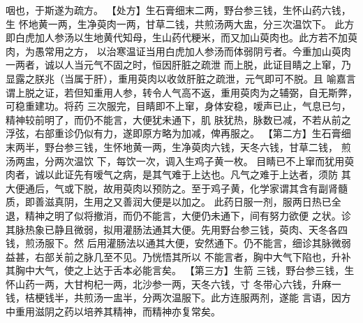 \documentclass[a4paper,12pt,UTF8,twoside]{ctexbook}
\begin{document}
咽也，于斯遂为疏方。 
【处方】生石膏细末二两，野台参三钱，生怀山药六钱，生 
怀地黄一两，生净萸肉一两，甘草二钱，共煎汤两大盅，分三次温饮下。 
此方即白虎加人参汤以生地黄代知母，生山药代粳米，而又加山萸肉也。此方若不加萸肉，为愚常用之方， 
以治寒温证当用白虎加人参汤而体弱阴亏者。今重加山萸肉一两者，诚以人当元气不固之时，恒因肝脏之疏泄 
而上脱，此证目睛之上窜，乃显露之朕兆（当属于肝），重用萸肉以收敛肝脏之疏泄，元气即可不脱。且 
喻嘉言谓上脱之证，若但知重用人参，转令人气高不返，重用萸肉为之辅弼，自无斯弊，可稳重建功。将药 
三次服完，目睛即不上窜，身体安稳，嗳声已止，气息已匀，精神较前明了，而仍不能言，大便犹未通下，肌 
肤犹热，脉数已减，不若从前之浮弦，右部重诊仍似有力，遂即原方略为加减，俾再服之。 
【第二方】生石膏细末两半，野台参三钱，生怀地黄一两，生净萸肉六钱，天冬六钱，甘草二钱， 
煎汤两盅，分两次温饮 
下，每饮一次，调入生鸡子黄一枚。 
目睛已不上窜而犹用萸肉者，诚以此证先有嗳气之病，是其气难于上达也。凡气之难于上达者，须防 
其大便通后，气或下脱，故用萸肉以预防之。至于鸡子黄，化学家谓其含有副肾髓 
质，即善滋真阴，生用之又善润大便是以加之。 
此药日服一剂，服两日热已全退，精神之明了似将撤消，而仍不能言，大便仍未通下，间有努力欲便 
之状。诊其脉热象已静且微弱，拟用灌肠法通其大便。先用野台参三钱，萸肉、天冬各四钱，煎汤服下。然 
后用灌肠法以通其大便，安然通下。仍不能言，细诊其脉微弱益甚，右部关前之脉几至不见。乃恍悟其所以 
不能言者，胸中大气下陷也，升补其胸中大气，使之上达于舌本必能言矣。 
【第三方】生箭 三钱，野台参三钱，生怀山药一两，大甘枸杞一两，北沙参一两，天冬六钱，寸 
冬带心六钱，升麻一钱，桔梗钱半，共煎汤一盅半，分两次温服下。此方连服两剂，遂能 
言语，因方中重用滋阴之药以培养其精神，而精神亦复常矣。 
\end{document}

